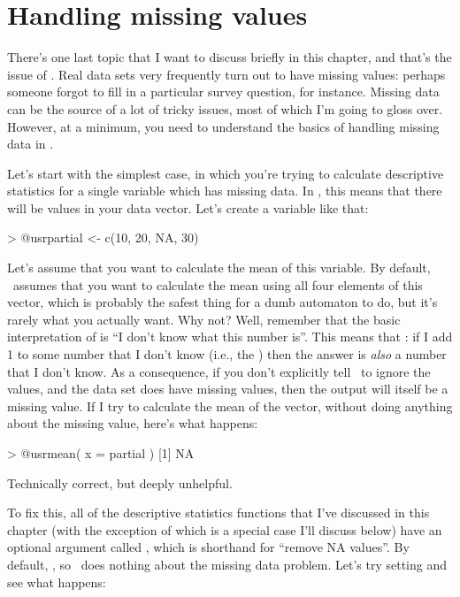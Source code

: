 \section{Handling missing values~\label{sec:missing}}

There's one last topic that I want to discuss briefly in this chapter, and that's the issue of . Real data sets very frequently turn out to have missing values: perhaps someone forgot to fill in a particular survey question, for instance. Missing data can be the source of a lot of tricky issues, most of which I'm going to gloss over. However, at a minimum, you need to understand the basics of handling missing data in \R. 



Let's start with the simplest case, in which you're trying to calculate descriptive statistics for a single variable which has missing data. In \R, this means that there will be  values in your data vector. Let's create a variable like that:
\begin{rblock1}
> @usr{partial <- c(10, 20, NA, 30)}
\end{rblock1}
Let's assume that you want to calculate the mean of this variable. By default, \R\ assumes that you want to calculate the mean using all four elements of this vector, which is probably the safest thing for a dumb automaton to do, but it's rarely what you actually want. Why not? Well, remember that the basic interpretation of  is ``I don't know what this number is''. This means that : if I add 1 to some number that I don't know (i.e., the ) then the answer is {\it also} a number that I don't know. As a consequence, if you don't explicitly tell \R\ to ignore the  values, and the data set does have missing values, then the output will itself be a missing value. If I try to calculate the mean of the  vector, without doing anything about the missing value, here's what happens:
\begin{rblock1}
> @usr{mean( x = partial )}
[1] NA
\end{rblock1}
Technically correct, but deeply unhelpful. 

To fix this, all of the descriptive statistics functions that I've discussed in this chapter (with the exception of  which is a special case I'll discuss below) have an optional argument called , which is shorthand for ``remove NA values''. By default, , so \R\ does nothing about the missing data problem. Let's try setting  and see what happens:

